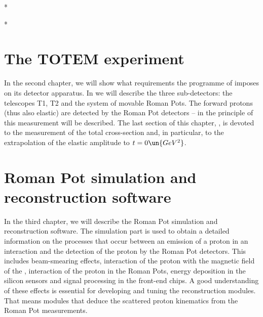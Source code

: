 
*

*


\chapter[ttm]{The TOTEM experiment}

In the second chapter, we will show what requirements the programme of  imposes on its detector apparatus. In  we will describe the three sub-detectors: the telescopes T1, T2 and the system of movable Roman Pots. The forward protons (thus also elastic) are detected by the Roman Pot detectors -- in  the principle of this measurement will be described. The last section of this chapter, , is devoted to the measurement of the total cross-section and, in particular, to the extrapolation of the elastic amplitude to $t=0\un{GeV^2}$.



\chapter[sr]{Roman Pot simulation and reconstruction software}


In the third chapter, we will describe the Roman Pot simulation and reconstruction software. The simulation part is used to obtain a detailed information on the processes that occur between an emission of a proton in an interaction and the detection of the proton by the Roman Pot detectors. This includes beam-smearing effects, interaction of the proton with the magnetic field of the , interaction of the proton in the Roman Pots, energy deposition in the silicon sensors and signal processing in the front-end chips. A good understanding of these effects is essential for developing and tuning the reconstruction modules. That means modules that deduce the scattered proton kinematics from the Roman Pot measurements.


